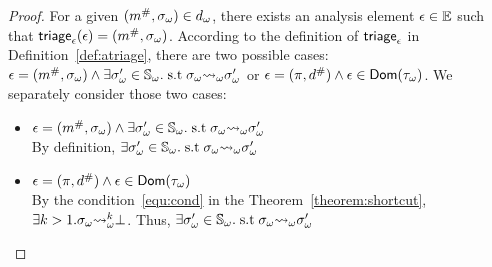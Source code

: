 \begin{proof}
  For a given $({m}^{\#}, {\sigma}_\omega) \in {d}_\omega$, there exists an analysis
  element $\epsilon \in \mathbb{E}$ such that $\textsf{triage}_\epsilon(\epsilon) = ({m}^{\#},
  {\sigma}_\omega)$.  According to the definition of $\textsf{triage}_\epsilon$ in
  Definition~\ref{def:atriage}, there are two possible cases: $\epsilon =
  ({m}^{\#}, {\sigma}_\omega) \wedge \exists {\sigma}_\omega' \in {\mathbb{S}}_\omega. \; \text{s.t} \;
  {\sigma}_\omega {\leadsto}_\omega {\sigma}_\omega'$ or $\epsilon = (\pi, {d}^{\#}) \wedge \epsilon \in
  \textsf{Dom}({\tau}_\omega)$. We separately consider those two cases:
  \begin{itemize}
    \item $\epsilon = ({m}^{\#}, {\sigma}_\omega) \wedge \exists {\sigma}_\omega' \in {\mathbb{S}}_\omega.
      \; \text{s.t} \; {\sigma}_\omega {\leadsto}_\omega {\sigma}_\omega'$\\
        By definition, $\exists {\sigma}_\omega' \in {\mathbb{S}}_\omega.  \; \text{s.t} \;
        {\sigma}_\omega {\leadsto}_\omega {\sigma}_\omega'$
    \item $\epsilon = (\pi, {d}^{\#}) \wedge \epsilon \in \textsf{Dom}({\tau}_\omega)$\\
      By the condition~\ref{equ:cond} in the Theorem~\ref{theorem:shortcut},\\
      $\exists k > 1. {\sigma}_\omega {\leadsto}_\omega^k \bot$.  Thus, $\exists {\sigma}_\omega' \in
      {\mathbb{S}}_\omega.  \; \text{s.t} \; {\sigma}_\omega {\leadsto}_\omega {\sigma}_\omega'$
  \end{itemize}
\end{proof}


